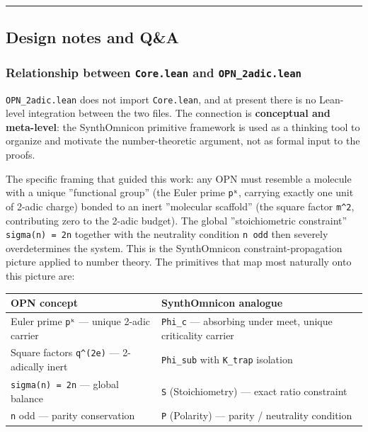 \documentclass[12pt,a4paper]{article}
\begin{document}
\begin{center}
\rule{0.5\textwidth}{0.4pt}
\end{center}

\subsection{Design notes and Q\&A}

\subsubsection{Relationship between \texttt{Core.lean} and \texttt{OPN\_2adic.lean}}

\texttt{OPN\_2adic.lean} does not import \texttt{Core.lean}, and at present there is no Lean-level integration
between the two files. The connection is \textbf{conceptual and meta-level}: the SynthOmnicon
primitive framework is used as a thinking tool to organize and motivate the number-theoretic
argument, not as formal input to the proofs.

The specific framing that guided this work: any OPN must resemble a molecule with a unique
''functional group'' (the Euler prime \texttt{pᵏ}, carrying exactly one unit of 2-adic charge) bonded to
an inert ''molecular scaffold'' (the square factor \texttt{m\^{}2}, contributing zero to the 2-adic budget).
The global ''stoichiometric constraint'' \texttt{sigma(n) = 2n} together with the neutrality condition \texttt{n odd}
then severely overdetermines the system. This is the SynthOmnicon constraint-propagation picture
applied to number theory. The primitives that map most naturally onto this picture are:

\begin{table}[htbp]
\centering
\small
{}
\begin{tabularx}{\textwidth}{>{\centering\arraybackslash}X >{\centering\arraybackslash}X}
\toprule
\rowcolor{gray!25}\textbf{OPN concept} & \textbf{SynthOmnicon analogue} \\
\midrule
\rowcolors{1}{white}{gray!10}
Euler prime \texttt{pᵏ} --- unique 2-adic carrier & \texttt{Phi\_c} --- absorbing under meet, unique criticality carrier \\
Square factors \texttt{q\^{}(2e)} --- 2-adically inert & \texttt{Phi\_sub} with \texttt{K\_trap} isolation \\
\texttt{sigma(n) = 2n} --- global balance & \texttt{S} (Stoichiometry) --- exact ratio constraint \\
\texttt{n} odd --- parity conservation & \texttt{P} (Polarity) --- parity / neutrality condition \\
\bottomrule
\end{tabularx}
\end{table}
\end{document}
